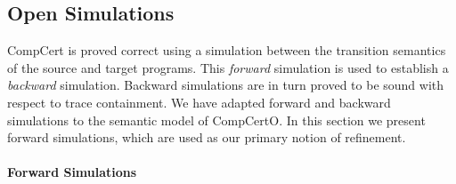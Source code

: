 \documentclass[sigplan,screen]{acmart}
\begin{document}
\subsection{Open Simulations} \label{sec:sem:ref} %

CompCert is proved correct using a simulation
between the transition semantics of the source and target programs.
This \emph{forward}
simulation is used to establish a \emph{backward} simulation.
Backward simulations
are in turn proved to be sound with respect to trace containment.
We have adapted forward and backward simulations to
the semantic model of CompCertO.
In this section we present forward simulations,
which are
used as our primary notion of refinement.

\paragraph{Forward Simulations} %
\end{document}
